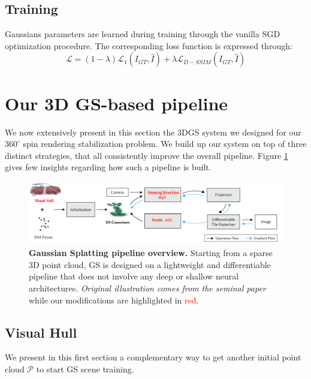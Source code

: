\subsection{Training} 
Gaussians parameters are learned during training through the vanilla \ac{SGD} optimization procedure. The corresponding loss function is expressed through: 
\begin{equation}
    \mathcal{L} = (1-\lambda)\mathcal{L}_{1}(I_{GT},\hat{I}) + \lambda \mathcal{L}_{D-SSIM}(I_{GT},\hat{I})
\end{equation}

\section{Our 3D GS-based pipeline}
We now extensively present in this section the 3D\ac{GS} system we designed for our $360^{\circ}$ spin rendering stabilization problem. We build up our system on top of three distinct strategies, that all consistently improve the overall pipeline. Figure \ref{fig:gs-overview} gives few insights regarding how such a pipeline is built. \newline

\begin{figure}[htb!]
    \center
  \includegraphics[width=\linewidth]{images/gaussiansplatting/overview_pipeline.png}
  \caption{\textbf{Gaussian Splatting pipeline overview.} Starting from a sparse 3D point cloud, GS is designed on a lightweight and differentiable pipeline that does not involve any deep or shallow neural architectures. \textit{Original illustration comes from the seminal paper}\citep{kerbl20233d} while our modifications are highlighted in \textcolor{red}{red}.}
  \label{fig:gs-overview}
\end{figure}

\subsection{Visual Hull}

We present in this first section a complementary way to get another initial point cloud $\mathcal{P}$ to start GS scene training. 

